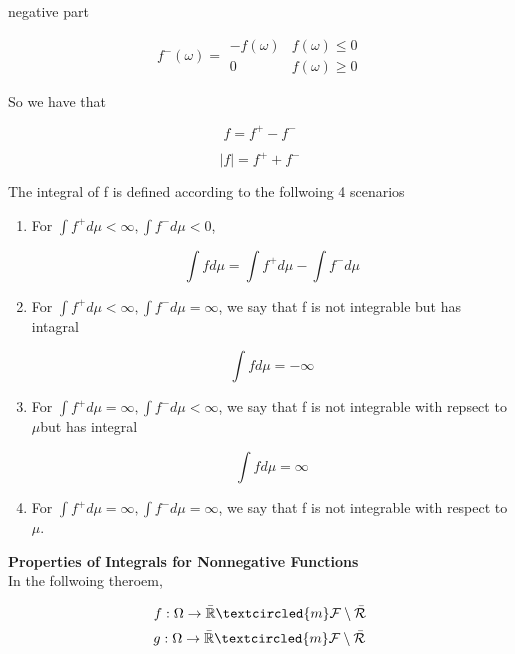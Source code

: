 \documentclass[11pt,fleqn]{book} %
\begin{document}
negative part

		$$f^-(\omega) = \begin{array}{ll}
			-f(\omega) & f(\omega) \leq 0\\
			0 & f(\omega) \geq 0
		\end{array} $$

So we have that

		$$ f = f^+ - f^-$$

		$$|f| = f^+ + f^- $$

The integral of f is defined according to the follwoing 4 scenarios

		\begin{enumerate}
			\item For $\int f^+ d\mu < \infty, \int f^- d\mu < 0 $, 

					$$\int f d\mu = \int f^+ d\mu - \int f^- d\mu $$

			\item For $\int f^+ d\mu < \infty, \int f^- d\mu = \infty $, we say that f is not integrable but has intagral 

					$$\int f d\mu = - \infty $$

			\item For $\int f^+ d\mu = \infty, \int f^- d\mu < \infty $, we say that f is not integrable with repsect to $\mu $but has integral 

					$$\int f d\mu = \infty $$

			\item For $\int f^+ d\mu = \infty, \int f^- d\mu = \infty $, we say that f is not integrable with respect to $\mu$.

			\end{enumerate}


\textbf{Properties of Integrals for Nonnegative Functions}\\

In the follwoing theroem, 

		$$f: \Omega \rightarrow \bar{\mathbb{R}} \textcircled{m} \mathcal{F}\setminus\bar{\mathcal{R}} $$
		$$g: \Omega \rightarrow \bar{\mathbb{R}} \textcircled{m} \mathcal{F}\setminus\bar{\mathcal{R}} $$
\end{document}
